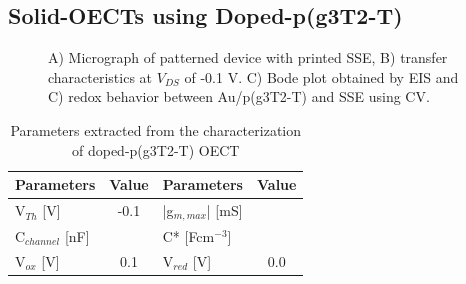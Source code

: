 \subsection{Solid-OECTs using Doped-p(g3T2-T)} \label{dopedOECTs}

\begin{figure}[ht]
    \centering
    \qquad
    \caption[Performance of solid-OECT with printed SSE]{A) Micrograph of patterned device with printed SSE, B) transfer characteristics at $V_{DS}$ of -0.1 V. C) Bode plot obtained by EIS and C) redox behavior between Au/p(g3T2-T) and SSE using CV.}
    \label{fig:printedSSE}
\end{figure}

\begin{table}[ht]
\centering
\caption{Parameters extracted from the characterization of doped-p(g3T2-T) OECT}
\begin{tabular}{l|c||l|c}
Parameters & Value & Parameters & Value \\\hline \hline
V$_{Th}$ [V] & -0.1 & |g$_{m,max}$| [mS] & \\
C$_{channel}$ [nF] &  & C* [Fcm$^{-3}$] &  \\
V$_{ox}$ [V] & 0.1 & V$_{red}$ [V] & 0.0 \\\hline
\end{tabular}
\label{tab:dropfom}
\end{table}

